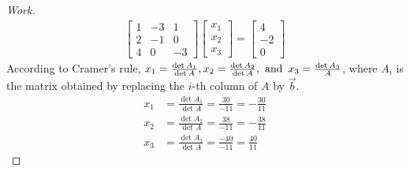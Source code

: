\documentclass{article}
\begin{document}
\begin{proof}[Work]
    \begin{align*}
        \begin{bmatrix}
            1 & -3 & 1  \\
            2 & -1 & 0  \\
            4 & 0  & -3
        \end{bmatrix}
        \begin{bmatrix}
            x_1 \\ x_2 \\ x_3
        \end{bmatrix} =
        \begin{bmatrix}
            4 \\ -2 \\ 0
        \end{bmatrix}
    \end{align*}
    According to Cramer's rule, $x_1 = \frac{\det A_1}{\det A}, x_2 = \frac{\det A_2}{\det A}, \operatorname{~\text{and}~} x_3 = \frac{\det A_3}{A}$, where $A_i$ is the matrix obtained by replacing the $i$-th column of $A$ by $\vec{b}$.
    \begin{align*}
        x_1 & = \frac{\det A_1}{\det A} = \frac{30}{-11} = -\frac{30}{11} \\
        x_2 & = \frac{\det A_2}{\det A} = \frac{38}{-11} = -\frac{38}{11} \\
        x_3 & = \frac{\det A_3}{\det A} = \frac{-40}{-11} = \frac{40}{11}
    \end{align*}
\end{proof}
\qdash
\end{document}
